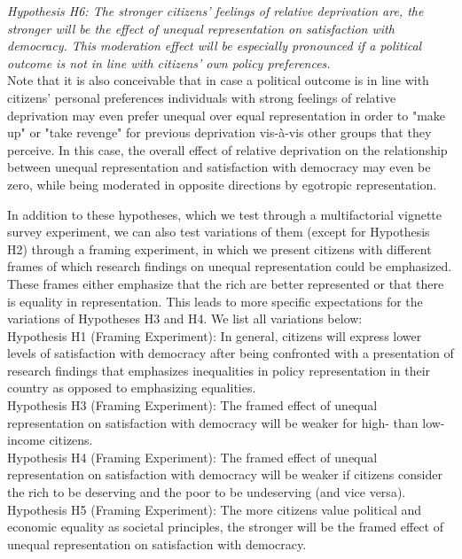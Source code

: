 \documentclass[12pt, letterpaper]{article}
\begin{document}
\begin{spacing}{1.5}
\smallskip  \textit{Hypothesis H6: The stronger citizens' feelings of relative deprivation are, the stronger will be the effect of unequal representation on satisfaction with democracy. This moderation effect will be especially pronounced if a political outcome is not in line with citizens' own policy preferences.}\\

Note that it is also conceivable that in case a political outcome is in line with citizens' personal preferences individuals with strong feelings of relative deprivation may even prefer unequal over equal representation in order to "make up" or "take revenge" for previous deprivation vis-à-vis other groups that they perceive. In this case, the overall effect of relative deprivation on the relationship between unequal representation and satisfaction with democracy may even be zero, while being moderated in opposite directions by egotropic representation.

In addition to these hypotheses, which we test through a multifactorial vignette survey experiment, we can also test variations of them (except for Hypothesis H2) through a framing experiment, in which we present citizens with different frames of which research findings on unequal representation could be emphasized. These frames either emphasize that the rich are better represented or that there is equality in representation. This leads to more specific expectations for the variations of Hypotheses H3 and H4. We list all variations below:\\

Hypothesis H1 (Framing Experiment): In general, citizens will express lower levels of satisfaction with democracy after being confronted with a presentation of research findings that emphasizes inequalities in policy representation in their country as opposed to emphasizing equalities.\\

Hypothesis H3 (Framing Experiment): The framed effect of unequal representation on satisfaction with democracy will be weaker for high- than low-income citizens.\\

Hypothesis H4 (Framing Experiment): The framed effect of unequal representation on satisfaction with democracy will be weaker if citizens consider the rich to be deserving and the poor to be undeserving (and vice versa).\\

Hypothesis H5 (Framing Experiment): The more citizens value political and economic equality as societal principles, the stronger will be the framed effect of unequal representation on satisfaction with democracy.\\


\end{spacing}
\end{document}

